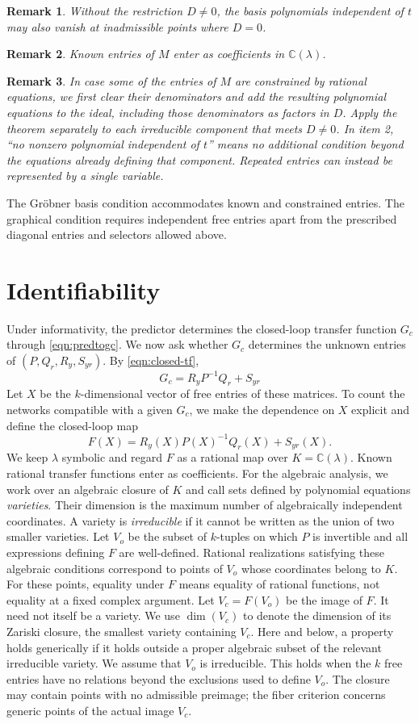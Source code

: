 \documentclass[journal,twoside,web]{ieeecolor}
\newtheorem{remark}{Remark}
\begin{document}
%
\begin{remark}
%
Without the restriction $D\neq 0$, the basis polynomials independent of
$t$ may also vanish at inadmissible points where $D=0$.
%
\end{remark}
\begin{remark}
%
Known entries of $M$ enter as coefficients in $\mathbb C(\lambda)$.
%
\end{remark}
%
\begin{remark}
%
In case some of the entries of $M$ are constrained by rational equations,
we first clear their denominators and add the resulting polynomial equations
to the ideal, including those denominators as factors in $D$.
Apply the theorem separately to each irreducible component that meets
$D\neq 0$. In item 2, ``no nonzero polynomial independent of $t$''
means no additional condition beyond the equations already defining
that component.
Repeated entries can instead be represented by a single variable.
%
\end{remark}
%
The Gröbner basis condition accommodates known and constrained entries.
The graphical condition requires independent free entries apart from the
prescribed diagonal entries and selectors allowed above.
%
\section{Identifiability}\label{sec:ident}
%
Under informativity, the predictor determines the closed-loop transfer
function $G_c$ through \eqref{eqn:predtogc}. We now ask whether $G_c$
determines the unknown entries of $(P,Q_r,R_y,S_{yr})$. By
\eqref{eqn:closed-tf},
%
$$G_c=R_yP^{-1}Q_r+S_{yr}$$
%
Let $X$ be the $k$-dimensional vector of free entries of these matrices.
To count the networks compatible with a given $G_c$, we make the dependence
on $X$ explicit and define the closed-loop map
%
$$F(X)=R_y(X)P(X)^{-1}Q_r(X)+S_{yr}(X).$$
%
We keep $\lambda$ symbolic and regard $F$ as a rational map over
$K=\mathbb C(\lambda)$. Known rational transfer functions enter as coefficients.
For the algebraic analysis, we work over an algebraic closure of $K$ and
call sets defined by polynomial equations {\it varieties}. Their dimension
is the maximum number of algebraically independent coordinates. A variety is {\it irreducible}
if it cannot be written as the union of two smaller varieties. Let $V_o$
be the subset of $k$-tuples on which $P$ is invertible and all expressions defining $F$ are
well-defined. Rational realizations satisfying these algebraic conditions
correspond to points of $V_o$ whose coordinates belong to $K$. For these points, equality
under $F$ means equality of rational functions, not equality at a fixed
complex argument.
Let $V_c=F(V_o)$ be the image of $F$. It need not itself be a variety.
We use $\dim(V_c)$ to denote the dimension of its Zariski closure, the
smallest variety containing $V_c$. Here and below, a property holds generically
if it holds outside a proper algebraic subset of the relevant irreducible
variety. We assume that $V_o$ is irreducible. This holds when the $k$ free
entries have no relations beyond the exclusions used to define $V_o$.
The closure may contain points with no admissible preimage;
the fiber criterion concerns generic points of the actual image $V_c$.
\end{document}
